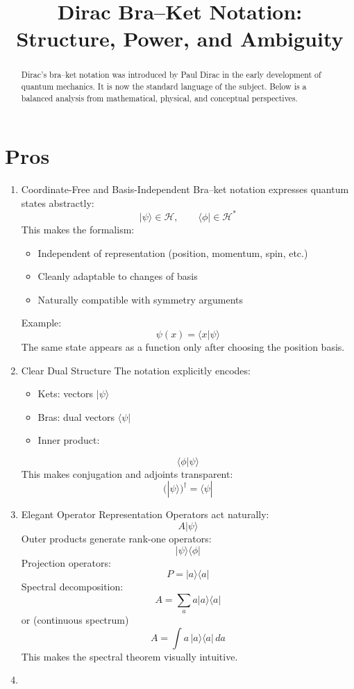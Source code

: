 \documentclass[12pt]{article}
\title{Dirac Bra--Ket Notation:\\
Structure, Power, and Ambiguity}
\author{}
\date{}
\begin{document}
\maketitle

\begin{abstract}
Dirac's bra--ket notation was introduced by Paul Dirac in the early
development of quantum mechanics. It is now the standard language of the
subject. Below is a balanced analysis from mathematical, physical, and
conceptual perspectives.
\end{abstract}

\section{ Pros}\label{pros}
\begin{enumerate}
   \item
 Coordinate-Free and Basis-Independent
Bra--ket notation expresses quantum states abstractly:
\[|\psi\rangle \in \mathcal{H}, \qquad \langle \phi| \in \mathcal{H}^*\]
This makes the formalism:
\begin{itemize}
\item
  Independent of representation (position, momentum, spin, etc.)
\item
  Cleanly adaptable to changes of basis
\item
  Naturally compatible with symmetry arguments
\end{itemize}
Example:
\[\psi(x) = \langle x|\psi\rangle\]
The same state appears as a function only after choosing the position
basis.
\item
 Clear Dual Structure
  The notation explicitly encodes:
\begin{itemize}
\item
  Kets: vectors \(|\psi\rangle\)
\item
  Bras: dual vectors \(\langle\psi|\)
\item
  Inner product:
\end{itemize}
\[\langle \phi | \psi \rangle\]
This makes conjugation and adjoints transparent:
\[(|\psi\rangle)^\dagger = \langle \psi|\]
\item
Elegant Operator Representation
Operators act naturally:
\[A|\psi\rangle\]
Outer products generate rank-one operators:
\[|\psi\rangle\langle\phi|\]
Projection operators:
\[P = |a\rangle\langle a|\]
Spectral decomposition:
\[A = \sum_a a |a\rangle\langle a|\]
or (continuous spectrum)
\[A = \int a\, |a\rangle\langle a|\, da\]
This makes the spectral theorem visually intuitive.
\item

\end{enumerate}
\end{document}
